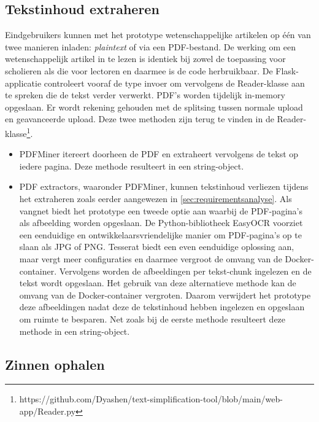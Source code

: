 \subsection{Tekstinhoud extraheren}

Eindgebruikers kunnen met het prototype wetenschappelijke artikelen op één van twee manieren inladen: \textit{plaintext} of via een PDF-bestand. De werking om een wetenschappelijk artikel in te lezen is identiek bij zowel de toepassing voor scholieren als die voor lectoren en daarmee is de code herbruikbaar. De Flask-applicatie controleert vooraf de type invoer om vervolgens de Reader-klasse aan te spreken die de tekst verder verwerkt. PDF's worden tijdelijk in-memory opgeslaan. Er wordt rekening gehouden met de splitsing tussen normale upload en geavanceerde upload. Deze twee methoden zijn terug te vinden in de Reader-klasse\footnote{https://github.com/Dyashen/text-simplification-tool/blob/main/web-app/Reader.py}.

\begin{itemize}
	\item PDFMiner itereert doorheen de PDF en extraheert vervolgens de tekst op iedere pagina. Deze methode resulteert in een string-object.
	\item PDF extractors, waaronder PDFMiner, kunnen tekstinhoud verliezen tijdens het extraheren zoals eerder aangewezen in \ref{sec:requirementsanalyse}. Als vangnet biedt het prototype een tweede optie aan waarbij de PDF-pagina's als afbeelding worden opgeslaan. De Python-bibliotheek EasyOCR voorziet een eenduidige en ontwikkelaarsvriendelijke manier om PDF-pagina's op te slaan als JPG of PNG. Tesserat biedt een even eenduidige oplossing aan, maar vergt meer configuraties en daarmee vergroot de omvang van de Docker-container. Vervolgens worden de afbeeldingen per tekst-chunk ingelezen en de tekst wordt opgeslaan. Het gebruik van deze alternatieve methode kan de omvang van de Docker-container vergroten. Daarom verwijdert het prototype deze afbeeldingen nadat deze de tekstinhoud hebben ingelezen en opgeslaan om ruimte te besparen. Net zoals bij de eerste methode resulteert deze methode in een string-object.
\end{itemize}


\subsection{Zinnen ophalen}

